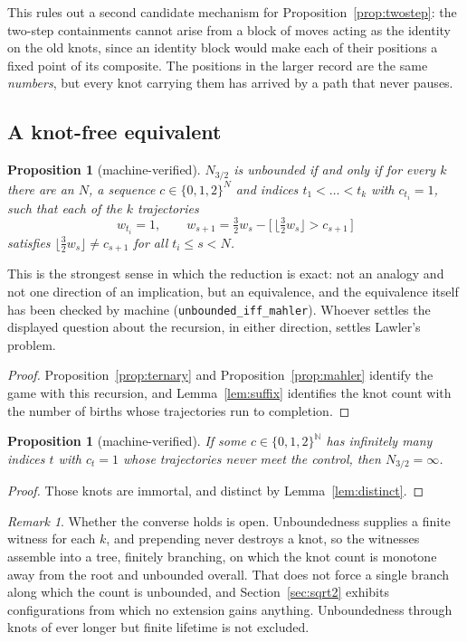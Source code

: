 \documentclass[11pt,reqno]{amsart}
\theoremstyle{plain}
\newtheorem{proposition}[theorem]{Proposition}
\theoremstyle{definition}
\theoremstyle{remark}
\newtheorem{remark}[theorem]{Remark}
\begin{document}
This rules out a second candidate mechanism for
Proposition~\ref{prop:twostep}: the two-step containments cannot arise from a
block of moves acting as the identity on the old knots, since an identity
block would make each of their positions a fixed point of its composite. The
positions in the larger record are the same \emph{numbers}, but every knot
carrying them has arrived by a path that never pauses.

\subsection{A knot-free equivalent}

\begin{proposition}[machine-verified]\label{prop:translation}
$N_{3/2}$ is unbounded if and only if for every $k$ there are an $N$, a sequence
$c\in\{0,1,2\}^N$ and indices $t_1<\dots<t_k$ with $c_{t_i}=1$, such that each
of the $k$ trajectories
\[
  w_{t_i}=1,\qquad
  w_{s+1}=\tfrac32w_s-\bigl[\,\lfloor\tfrac32w_s\rfloor>c_{s+1}\,\bigr]
\]
satisfies $\lfloor\tfrac32w_s\rfloor\neq c_{s+1}$ for all $t_i\leq s<N$.
\end{proposition}

This is the strongest sense in which the reduction is exact: not an analogy
and not one direction of an implication, but an equivalence, and the
equivalence itself has been checked by machine
(\texttt{unbounded\_iff\_mahler}). Whoever settles the displayed question about
the recursion, in either direction, settles Lawler's problem.

\begin{proof}
Proposition~\ref{prop:ternary} and Proposition~\ref{prop:mahler} identify the
game with this recursion, and Lemma~\ref{lem:suffix} identifies the knot count
with the number of births whose trajectories run to completion.
\end{proof}

\begin{proposition}[machine-verified]\label{prop:immortal32}
If some $c\in\{0,1,2\}^{\mathbb N}$ has infinitely many indices $t$ with $c_t=1$
whose trajectories never meet the control, then $N_{3/2}=\infty$.
\end{proposition}

\begin{proof}
Those knots are immortal, and distinct by Lemma~\ref{lem:distinct}.
\end{proof}

\begin{remark}\label{rem:converse}
Whether the converse holds is open. Unboundedness supplies a finite witness for
each $k$, and prepending never destroys a knot, so the witnesses assemble into a
tree, finitely branching, on which the knot count is monotone away from the root
and unbounded overall. That does not force a single branch along which the count
is unbounded, and Section~\ref{sec:sqrt2} exhibits configurations from which no
extension gains anything. Unboundedness through knots of ever longer but finite
lifetime is not excluded.
\end{remark}
\end{document}
